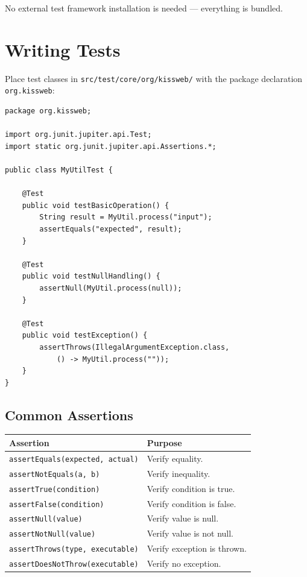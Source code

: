 \noindent
No external test framework installation is needed --- everything is bundled.

\section{Writing Tests}
\label{sec:test-writing}

Place test classes in \texttt{src/test/core/org/kissweb/} with the package declaration \texttt{org.kissweb}:

\begin{lstlisting}[style=java]
package org.kissweb;

import org.junit.jupiter.api.Test;
import static org.junit.jupiter.api.Assertions.*;

public class MyUtilTest {

    @Test
    public void testBasicOperation() {
        String result = MyUtil.process("input");
        assertEquals("expected", result);
    }

    @Test
    public void testNullHandling() {
        assertNull(MyUtil.process(null));
    }

    @Test
    public void testException() {
        assertThrows(IllegalArgumentException.class,
            () -> MyUtil.process(""));
    }
}
\end{lstlisting}

\subsection{Common Assertions}

\begin{longtable}{P{4.8cm}P{5.7cm}}
\toprule
\textbf{Assertion} & \textbf{Purpose} \\
\midrule
\endhead
\texttt{assertEquals(expected, actual)} & Verify equality. \\
\texttt{assertNotEquals(a, b)} & Verify inequality. \\
\texttt{assertTrue(condition)} & Verify condition is true. \\
\texttt{assertFalse(condition)} & Verify condition is false. \\
\texttt{assertNull(value)} & Verify value is null. \\
\texttt{assertNotNull(value)} & Verify value is not null. \\
\texttt{assertThrows(type, executable)} & Verify exception is thrown. \\
\texttt{assertDoesNotThrow(\allowbreak executable)} & Verify no exception. \\
\bottomrule
\end{longtable}

